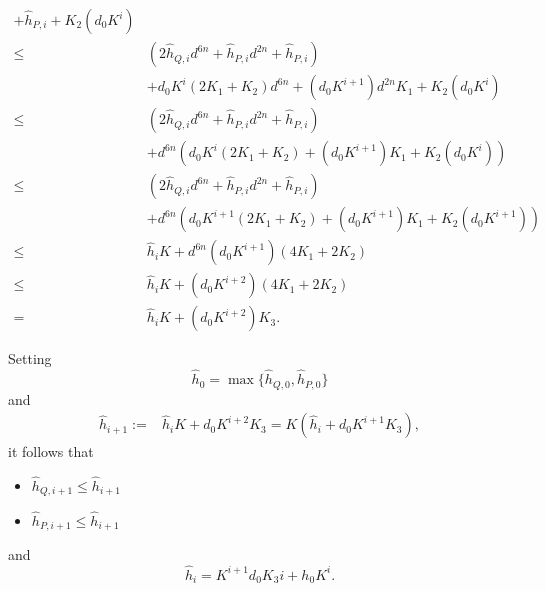 \documentclass[12pt]{article}
\begin{document}
\begin{itemize}
\begin{itemize}
\begin{align*}
    +\hat{h}_{P,i}+K_2(d_0K^i)
    \\
    \leq & (2\hat{h}_{Q,i}d^{6n} + \hat{h}_{P,i}d^{2n}+ \hat{h}_{P,i})\\
    &+ d_0K^i(2K_1+K_2)d^{6n}+ (d_0K^{i+1})d^{2n}K_1
    +K_2(d_0K^i)
    \\
    \leq & (2\hat{h}_{Q,i}d^{6n} + \hat{h}_{P,i}d^{2n}+ \hat{h}_{P,i})\\
    &+ d^{6n}(d_0K^i(2K_1+K_2)+ (d_0K^{i+1})K_1+K_2(d_0K^i))
    \\
    \leq & (2\hat{h}_{Q,i}d^{6n} + \hat{h}_{P,i}d^{2n}+ \hat{h}_{P,i})\\
    &+ d^{6n}(d_0K^{i+1}(2K_1+K_2)+ (d_0K^{i+1})K_1+K_2(d_0K^{i+1}))\\
    \leq & \hat{h}_iK + d^{6n}(d_0K^{i+1})(4K_1+2K_2)\\
    \leq & \hat{h}_iK + (d_0K^{i+2})(4K_1+2K_2)\\
    = & \hat{h}_iK + (d_0K^{i+2})K_3.
    \end{align*}
\end{itemize}
%
Setting
\[
\hat{h}_0 = \max\{\hat{h}_{Q,0},\hat{h}_{P,0}\}
\]
%
and
%
\begin{align*}
\hat{h}_{i+1} := &\hat{h}_iK + d_0K^{i+2}K_3 
= K(\hat{h}_i + d_0K^{i+1}K_3),
\end{align*}
%
it follows that
\begin{itemize}
    \item $\hat{h}_{Q,i+1} \leq \hat{h}_{i+1}$
    \item $\hat{h}_{P,i+1} \leq \hat{h}_{i+1}$
\end{itemize}
and 
\[
\hat{h}_i = K^{i+1}d_0K_3i+h_0K^i. 
\]







\end{itemize}
\end{document}
